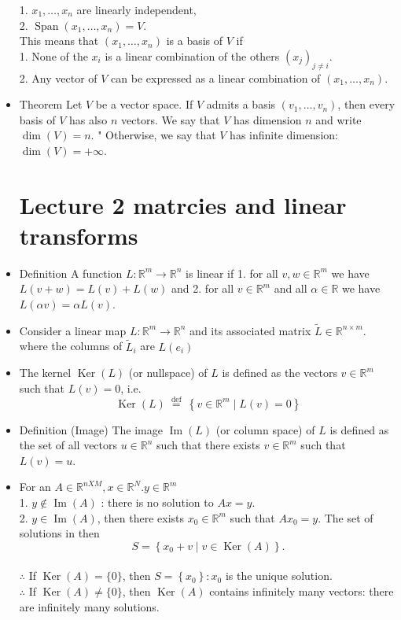 \documentclass[12pt,twoside]{article}
\begin{document}
\begin{itemize}
1. $x_1, \ldots, x_n$ are linearly independent,
\\2. $\operatorname{Span}\left(x_1, \ldots, x_n\right)=V$.
\\This means that $\left(x_1, \ldots, x_n\right)$ is a basis of $V$ if
\\1. None of the $x_i$ is a linear combination of the others $\left(x_j\right)_{j \neq i}$.
\\2. Any vector of $V$ can be expressed as a linear combination of $\left(x_1, \ldots, x_n\right)$.
\item {}Theorem
Let $V$ be a vector space.
If $V$ admits a basis $\left(v_1, \ldots, v_n\right)$, then every basis of $V$ has also $n$ vectors. We say that $V$ has dimension $n$ and write $\operatorname{dim}(V)=n$.
" Otherwise, we say that $V$ has infinite dimension:
$
\operatorname{dim}(V)=+\infty \text {. }
$
\section{Lecture 2 matrcies and linear transforms}
\item {}Definition
A function $L: \mathbb{R}^m \rightarrow \mathbb{R}^n$ is linear if
1. for all $v, w \in \mathbb{R}^m$ we have $L(v+w)=L(v)+L(w)$ and
2. for all $v \in \mathbb{R}^m$ and all $\alpha \in \mathbb{R}$ we have $L(\alpha v)=\alpha L(v)$.
\item {} Consider a linear map $L: \mathbb{R}^m \rightarrow \mathbb{R}^n$ and its associated matrix $\widetilde{L} \in \mathbb{R}^{n \times m}$. where the columns of $\tilde{L}_i$ are $L(e_i)$ 
\item {} The kernel $\operatorname{Ker}(L)$ (or nullspace) of $L$ is defined as the vectors $v \in \mathbb{R}^m$ such that $L(v)=0$, i.e.
$$
\operatorname{Ker}(L) \stackrel{\text { def }}{=}\left\{v \in \mathbb{R}^m \mid L(v)=0\right\}
$$
\item {}
Definition (Image)
The image $\operatorname{Im}(L)$ (or column space) of $L$ is defined as the set of all vectors $u \in \mathbb{R}^n$ such that there exists $v \in \mathbb{R}^m$ such that $L(v)=u$.
\item {} For an $A\in \mathbb{R}^{nXM}, x\in \mathbb{R}^N. y\in \mathbb{R}^m$ 
\\1. $y \notin \operatorname{Im}(A)$ : there is no solution to $A x=y$.
\\2. $y \in \operatorname{Im}(A)$, then there exists $x_0 \in \mathbb{R}^m$ such that $A x_0=y$. The set of solutions in then
$$
S=\left\{x_0+v \mid v \in \operatorname{Ker}(A)\right\} .
$$
\\$\therefore$ If $\operatorname{Ker}(A)=\{0\}$, then $S=\left\{x_0\right\}: x_0$ is the unique solution.
\\$\therefore$ If $\operatorname{Ker}(A) \neq\{0\}$, then $\operatorname{Ker}(A)$ contains infinitely many vectors: there are infinitely many solutions.

\end{itemize}
\end{document}
